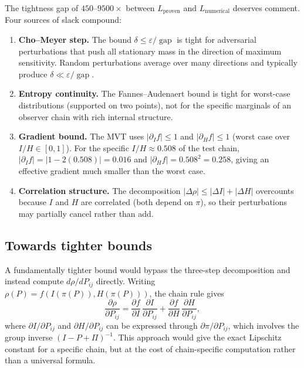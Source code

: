 \documentclass[11pt,a4paper]{article}
\DeclareMathOperator{\gap}{gap}
\begin{document}
The tightness gap of $450$--$9500\times$ between
$L_{\mathrm{proven}}$ and $L_{\mathrm{numerical}}$ deserves comment.
Four sources of slack compound:

\begin{enumerate}
  \item[(a)] \textbf{Cho--Meyer step.}  The bound
    $\delta \le \varepsilon/\gap$ is tight for adversarial perturbations
    that push all stationary mass in the direction of maximum
    sensitivity.  Random perturbations average over many directions and
    typically produce $\delta \ll \varepsilon/\gap$.

  \item[(b)] \textbf{Entropy continuity.}  The Fannes--Audenaert bound
    is tight for worst-case distributions (supported on two points),
    not for the specific marginals of an observer chain with rich
    internal structure.

  \item[(c)] \textbf{Gradient bound.}  The MVT uses
    $|\partial_I f| \le 1$ and $|\partial_H f| \le 1$ (worst case
    over $I/H \in [0,1]$).  For the specific $I/H \approx 0.508$ of
    the test chain, $|\partial_I f| = |1 - 2(0.508)| = 0.016$ and
    $|\partial_H f| = 0.508^2 = 0.258$, giving an effective gradient
    much smaller than the worst case.

  \item[(d)] \textbf{Correlation structure.}  The decomposition
    $|\Delta\rho| \le |\Delta I| + |\Delta H|$ overcounts because $I$
    and $H$ are correlated (both depend on $\pi$), so their
    perturbations may partially cancel rather than add.
\end{enumerate}

\subsection{Towards tighter bounds}

A fundamentally tighter bound would bypass the three-step decomposition
and instead compute $d\rho/dP_{ij}$ directly.  Writing
$\rho(P) = f(I(\pi(P)), H(\pi(P)))$, the chain rule gives
\[
  \frac{\partial \rho}{\partial P_{ij}}
  = \frac{\partial f}{\partial I}\,\frac{\partial I}{\partial P_{ij}}
  + \frac{\partial f}{\partial H}\,\frac{\partial H}{\partial P_{ij}},
\]
where $\partial I/\partial P_{ij}$ and $\partial H/\partial P_{ij}$
can be expressed through $\partial \pi/\partial P_{ij}$, which involves
the group inverse $(I - P + \Pi)^{-1}$.  This approach would give the
exact Lipschitz constant for a specific chain, but at the cost of
chain-specific computation rather than a universal formula.
\end{document}

